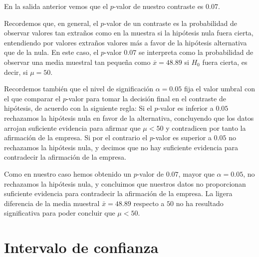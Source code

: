 \documentclass[
  title=normal,
  notoc,
  nobib,
  degree=mecinf]{mnye}
\newenvironment{Shaded}{\begin{snugshade}}{\end{snugshade}}
\newcommand{\NormalTok}[1]{#1}
\begin{document}
\begin{Shaded}
\end{Shaded}

En la salida anterior vemos que el \(p\)-valor de nuestro contraste es \(0.07\).

Recordemos que, en general, el \(p\)-valor de un contraste es la probabilidad de observar valores tan extraños como en la muestra si la hipótesis nula fuera cierta, entendiendo por valores extraños valores más a favor de la hipótesis alternativa que de la nula.
En este caso, el \(p\)-valor \(0.07\) se interpreta como la probabilidad de observar una media muestral tan pequeña como \(\overline{x}=48.89\) si \(H_0\) fuera cierta, es decir, si \(\mu=50\).

Recordemos también que el nivel de significación \(\alpha = 0.05\) fija el valor umbral con el que comparar el \(p\)-valor para tomar la decisión final en el contraste de hipótesis, de acuerdo con la siguiente regla:
Si el \(p\)-valor es inferior a \(0.05\) rechazamos la hipótesis nula en favor de la alternativa, concluyendo que los datos arrojan suficiente evidencia para afirmar que \(\mu<50\) y contradicen por tanto la afirmación de la empresa.
Si por el contrario el \(p\)-valor es superior a \(0.05\) no rechazamos la hipótesis nula, y decimos que no hay suficiente evidencia para contradecir la afirmación de la empresa.

Como en nuestro caso hemos obtenido un \(p\)-valor de \(0.07\), mayor que \(\alpha = 0.05\), no rechazamos la hipótesis nula, y concluimos que nuestros datos no proporcionan suficiente evidencia para contradecir la afirmación de la empresa. La ligera diferencia de la media muestral \(\bar{x} = 48.89\) respecto a \(50\) no ha resultado significativa para poder concluir que \(\mu<50\).

\hypertarget{conf_int}{%
\section{Intervalo de confianza}\label{conf_int}}
\end{document}
